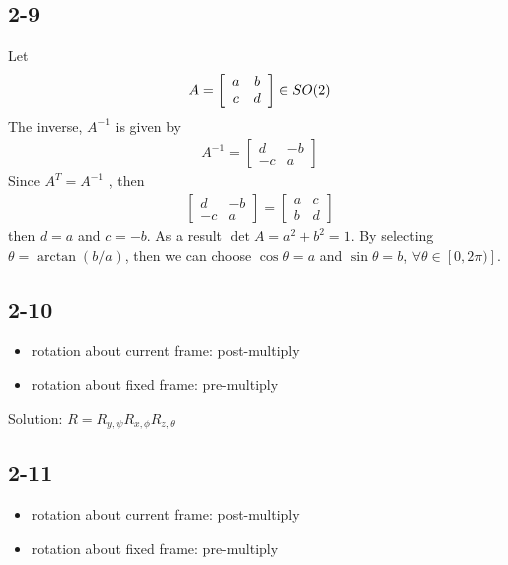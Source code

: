 \subsection*{2-9}
Let 
\begin{align*}
A=\left[\begin{array}{cc} 
a & b \\
c & d 
\end{array}\right] \in \space SO(2)
\end{align*}
The inverse, $A^{-1}$ is given by
\begin{align*}
A^{-1}= \left[\begin{array}{cc} 
d & -b \\
-c & a 
\end{array}\right]
\end{align*}
Since $A^T=A^{-1}$ , then
\begin{align*}
\left[\begin{array}{cc} 
d & -b \\
-c & a 
\end{array}\right] =  \left[\begin{array}{cc} 
a & c \\
b & d 
\end{array}\right]
\end{align*}
then $d=a$ and $c=-b$. As a result $\det A = a^2 + b^2 = 1$. By selecting $\theta = \arctan (b/a)$, then we can choose $\cos\theta = a$ and $\sin\theta=b$, $\forall \theta \in [0,2\pi)]$.

\subsection*{2-10}

\begin{itemize}
	\item rotation about current frame: post-multiply
	\item rotation about fixed frame: pre-multiply
\end{itemize}

Solution: $R=R_{y,\psi}R_{x,\phi}R_{z,\theta}$

\subsection*{2-11}
\begin{itemize}
	\item rotation about current frame: post-multiply
	\item rotation about fixed frame: pre-multiply
\end{itemize}

